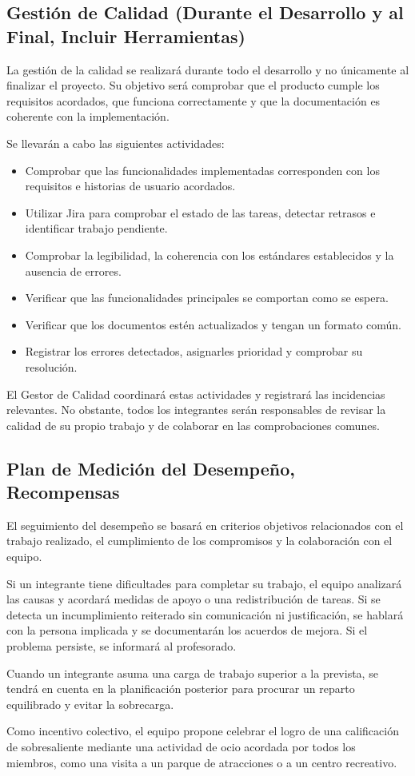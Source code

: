 \subsection{Gestión de Calidad (Durante el Desarrollo y al Final, Incluir Herramientas)}

La gestión de la calidad se realizará durante todo el desarrollo y no únicamente al finalizar el proyecto. Su objetivo será comprobar que el producto cumple los requisitos acordados, que funciona correctamente y que la documentación es coherente con la implementación.

Se llevarán a cabo las siguientes actividades:

\begin{itemize}
    \item Comprobar que las funcionalidades implementadas corresponden con los requisitos e historias de usuario acordados.
    \item Utilizar Jira para comprobar el estado de las tareas, detectar retrasos e identificar trabajo pendiente.
    \item Comprobar la legibilidad, la coherencia con los estándares establecidos y la ausencia de errores.
    \item Verificar que las funcionalidades principales se comportan como se espera.
    \item Verificar que los documentos estén actualizados y tengan un formato común.
    \item Registrar los errores detectados, asignarles prioridad y comprobar su resolución.
\end{itemize}

El Gestor de Calidad coordinará estas actividades y registrará las incidencias relevantes. No obstante, todos los integrantes serán responsables de revisar la calidad de su propio trabajo y de colaborar en las comprobaciones comunes.

\subsection{Plan de Medición del Desempeño, Recompensas}

El seguimiento del desempeño se basará en criterios objetivos relacionados con el trabajo realizado, el cumplimiento de los compromisos y la colaboración con el equipo.

Si un integrante tiene dificultades para completar su trabajo, el equipo analizará las causas y acordará medidas de apoyo o una redistribución de tareas. Si se detecta un incumplimiento reiterado sin comunicación ni justificación, se hablará con la persona implicada y se documentarán los acuerdos de mejora. Si el problema persiste, se informará al profesorado.

Cuando un integrante asuma una carga de trabajo superior a la prevista, se tendrá en cuenta en la planificación posterior para procurar un reparto equilibrado y evitar la sobrecarga.

Como incentivo colectivo, el equipo propone celebrar el logro de una calificación de sobresaliente mediante una actividad de ocio acordada por todos los miembros, como una visita a un parque de atracciones o a un centro recreativo.